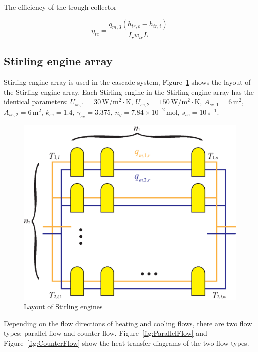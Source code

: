 \documentclass{article}
\begin{document}
The efficiency of the trough collector

\begin{equation*}
	\eta_{tc}=\frac{q_{m,3}(h_{tr,o}-h_{tr,i})}{I_rw_{tc}L}
\end{equation*}

\subsection{Stirling engine array}

Stirling engine array is used in the cascade system, Figure~\ref{fig:Layout of Stirling engines} shows the layout of the Stirling engine array. Each Stirling engine in the Stirling engine array has the identical parameters: $U_{se,1}=30\,$W/m$^2\cdot$K, $U_{se,2}=150\,$W/m$^2\cdot$K, $A_{se,1}=6\,$m$^2$, $A_{se,2}=6\,$m$^2$, $k_{se}=1.4$, $\gamma_{se}=3.375$, $n_g=7.84\times{}10^{-2}\,$mol, $s_{se}=10\,$s$^{-1}$.

\noindent \begin{figure}[htbp]
\begin{center}
	\includegraphics[width = 0.7\columnwidth]{./graphics/StirlingEngineArray}
	\caption{Layout of Stirling engines}
	\label{fig:Layout of Stirling engines}
\end{center}
\end{figure}

Depending on the flow directions of heating and cooling flows, there are two flow types: parallel flow and counter flow. Figure~\ref{fig:ParallelFlow} and Figure~\ref{fig:CounterFlow} show the heat transfer diagrams of the two flow types.
\end{document}
